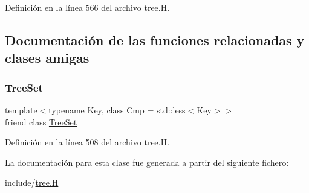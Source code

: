 Definición en la línea 566 del archivo tree.\+H.



\subsection{Documentación de las funciones relacionadas y clases amigas}
\mbox{\label{class_designar_1_1_tree_set_1_1_preorder_iterator_a7caa42294700d2a60905ec3458a7cd8a}} 
\subsubsection{\texorpdfstring{Tree\+Set}{TreeSet}}
{\footnotesize\ttfamily template$<$typename Key, class Cmp = std\+::less$<$\+Key$>$$>$ \\
friend class \hyperlink{class_designar_1_1_tree_set}{Tree\+Set}\hspace{0.3cm}{\ttfamily [friend]}}



Definición en la línea 508 del archivo tree.\+H.



La documentación para esta clase fue generada a partir del siguiente fichero\+:\begin{DoxyCompactItemize}
\item 
include/\hyperlink{tree_8_h}{tree.\+H}\end{DoxyCompactItemize}
